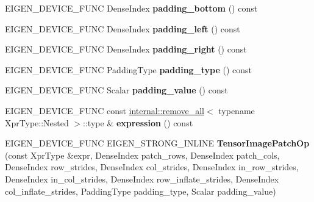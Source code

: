 \begin{DoxyCompactItemize}
E\+I\+G\+E\+N\+\_\+\+D\+E\+V\+I\+C\+E\+\_\+\+F\+U\+NC Dense\+Index {\bfseries padding\+\_\+bottom} () const
\item 
\mbox{\label{class_eigen_1_1_tensor_image_patch_op_a1c66056d679b7dcc50efe7af9d600bf0}} 
E\+I\+G\+E\+N\+\_\+\+D\+E\+V\+I\+C\+E\+\_\+\+F\+U\+NC Dense\+Index {\bfseries padding\+\_\+left} () const
\item 
\mbox{\label{class_eigen_1_1_tensor_image_patch_op_ad4a8b747724bb5492a316c6e62cb0a50}} 
E\+I\+G\+E\+N\+\_\+\+D\+E\+V\+I\+C\+E\+\_\+\+F\+U\+NC Dense\+Index {\bfseries padding\+\_\+right} () const
\item 
\mbox{\label{class_eigen_1_1_tensor_image_patch_op_a2a9fc311b5bf5b8f5af3f8f2615c03e0}} 
E\+I\+G\+E\+N\+\_\+\+D\+E\+V\+I\+C\+E\+\_\+\+F\+U\+NC Padding\+Type {\bfseries padding\+\_\+type} () const
\item 
\mbox{\label{class_eigen_1_1_tensor_image_patch_op_aef3b70902d79ad27971e9fe6741d7ba7}} 
E\+I\+G\+E\+N\+\_\+\+D\+E\+V\+I\+C\+E\+\_\+\+F\+U\+NC Scalar {\bfseries padding\+\_\+value} () const
\item 
\mbox{\label{class_eigen_1_1_tensor_image_patch_op_ae119ac0377ce27652a83f58a8bbdfd56}} 
E\+I\+G\+E\+N\+\_\+\+D\+E\+V\+I\+C\+E\+\_\+\+F\+U\+NC const \hyperlink{struct_eigen_1_1internal_1_1remove__all}{internal\+::remove\+\_\+all}$<$ typename Xpr\+Type\+::\+Nested $>$\+::type \& {\bfseries expression} () const
\item 
\mbox{\label{class_eigen_1_1_tensor_image_patch_op_a718858827fba7cadb563a76889a3c76d}} 
E\+I\+G\+E\+N\+\_\+\+D\+E\+V\+I\+C\+E\+\_\+\+F\+U\+NC E\+I\+G\+E\+N\+\_\+\+S\+T\+R\+O\+N\+G\+\_\+\+I\+N\+L\+I\+NE {\bfseries Tensor\+Image\+Patch\+Op} (const Xpr\+Type \&expr, Dense\+Index patch\+\_\+rows, Dense\+Index patch\+\_\+cols, Dense\+Index row\+\_\+strides, Dense\+Index col\+\_\+strides, Dense\+Index in\+\_\+row\+\_\+strides, Dense\+Index in\+\_\+col\+\_\+strides, Dense\+Index row\+\_\+inflate\+\_\+strides, Dense\+Index col\+\_\+inflate\+\_\+strides, Padding\+Type padding\+\_\+type, Scalar padding\+\_\+value)
\item 

\end{DoxyCompactItemize}
